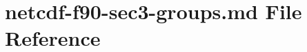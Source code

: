 \hypertarget{netcdf-f90-sec3-groups_8md}{}\section{netcdf-\/f90-\/sec3-\/groups.md File Reference}
\label{netcdf-f90-sec3-groups_8md}
